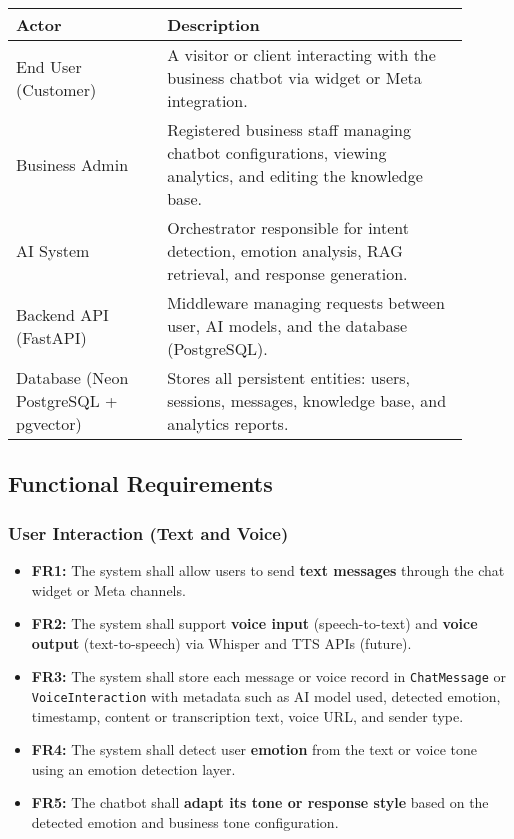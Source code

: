 \documentclass[12pt,a4paper]{article}
\begin{document}
\begin{table}[H]
\centering
\renewcommand{\arraystretch}{1.3}
\begin{tabular}{|p{0.3\linewidth}|p{0.6\linewidth}|}
\hline
\textbf{Actor} & \textbf{Description} \\
\hline
End User (Customer) & A visitor or client interacting with the business chatbot via widget or Meta integration. \\
\hline
Business Admin & Registered business staff managing chatbot configurations, viewing analytics, and editing the knowledge base. \\
\hline
AI System & Orchestrator responsible for intent detection, emotion analysis, RAG retrieval, and response generation. \\
\hline
Backend API (FastAPI) & Middleware managing requests between user, AI models, and the database (PostgreSQL). \\
\hline
Database (Neon PostgreSQL + pgvector) & Stores all persistent entities: users, sessions, messages, knowledge base, and analytics reports. \\
\hline
\end{tabular}
\end{table}

\vspace{1em}
\noindent\hrulefill
\vspace{1em}

\subsection{Functional Requirements}

\subsubsection{User Interaction (Text and Voice)}
\begin{itemize}
    \item \textbf{FR1:} The system shall allow users to send \textbf{text messages} through the chat widget or Meta channels.
    \item \textbf{FR2:} The system shall support \textbf{voice input} (speech-to-text) and \textbf{voice output} (text-to-speech) via Whisper and TTS APIs (future).
    \item \textbf{FR3:} The system shall store each message or voice record in \texttt{ChatMessage} or \texttt{VoiceInteraction} with metadata such as AI model used, detected emotion, timestamp, content or transcription text, voice URL, and sender type.
    \item \textbf{FR4:} The system shall detect user \textbf{emotion} from the text or voice tone using an emotion detection layer.
    \item \textbf{FR5:} The chatbot shall \textbf{adapt its tone or response style} based on the detected emotion and business tone configuration.
\end{itemize}
\end{document}
